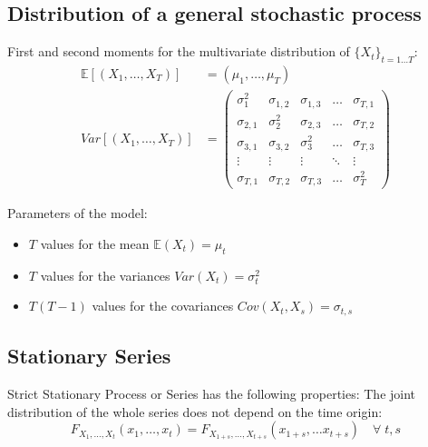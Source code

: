 \subsection{Distribution of a general stochastic process}

First and second moments for the multivariate distribution of $\{X_t\}_{t=1\dots T}$:
\begin{align*}
	\mathbb{E}[(X_1, \dots, X_T)] & = (\mu_1, \dots, \mu_T)                                              \\
	Var[(X_1, \dots, X_T)]        & = \begin{pmatrix}
		                                  \sigma_1^2   & \sigma_{1,2} & \sigma_{1,3} & \dots  & \sigma_{T,1} \\
		                                  \sigma_{2,1} & \sigma_2^2   & \sigma_{2,3} & \dots  & \sigma_{T,2} \\
		                                  \sigma_{3,1} & \sigma_{3,2} & \sigma_3^2   & \dots  & \sigma_{T,3} \\
		                                  \vdots       & \vdots       & \vdots       & \ddots & \vdots       \\
		                                  \sigma_{T,1} & \sigma_{T,2} & \sigma_{T,3} & \dots  & \sigma_T^2
	                                  \end{pmatrix}
\end{align*}

Parameters of the model:
\begin{itemize}
    \item $T$ values for the mean $\mathbb{E}(X_t) = \mu_t$
    \item $T$ values for the variances $Var(X_t) = \sigma_t^2$
    \item $T(T-1)$ values for the covariances $Cov(X_t, X_s) = \sigma_{t,s}$
\end{itemize}

\subsection{Stationary Series}

Strict Stationary Process or Series has the following properties:
The joint distribution of the whole series does not depend on the time
origin:
\begin{equation}
    F_{X_1, \dots, X_t}(x_1, \dots, x_t) = F_{X_{1+s}, \dots, X_{t+s}}(x_{1+s}, \dots x_{t+s}) \quad \forall\; t,s
\end{equation}

